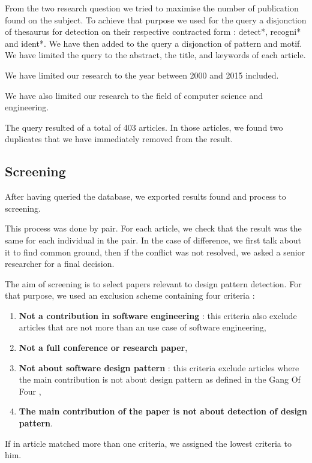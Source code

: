 \documentclass[letterpaper, 10 pt, conference]{ieeeconf}  %
\begin{document}
From the two research question we tried to maximise the number of publication found on the subject. To achieve that purpose we used for the query a disjonction of thesaurus for detection on their respective contracted form : detect*, recogni* and ident*. We have then added to the query a disjonction of pattern and motif.
We have limited the query to the abstract, the title, and keywords of each article.

We have limited our research to the year between 2000 and 2015 included. 

We have also limited our research to the field of computer science and engineering.

The query resulted of a total of 403 articles. In those articles, we found two duplicates that we have immediately removed from the result.

\subsection{Screening}

After having queried the database, we exported results found and process to screening. 

This process was done by pair. For each article, we check that the result was the same for each individual in the pair. In the case of difference, we first talk about it to find common ground, then if the conflict was not resolved, we asked a senior researcher for a final decision.

The aim of screening is to select papers relevant to design pattern detection. For that purpose, we used an exclusion scheme containing four criteria :

\begin{enumerate}
	\item \textbf{Not a contribution in software engineering} : this criteria also exclude articles that are not more than an use case of software engineering,
	\item \textbf{Not a full conference or research paper},
	\item \textbf{Not about software design pattern} : this criteria exclude articles where the main contribution is not about design pattern as defined in the Gang Of Four ,
	\item \textbf{The main contribution of the paper is not about detection of design pattern}.
\end{enumerate}

If in article matched more than one criteria, we assigned the lowest criteria to him.
\end{document}

